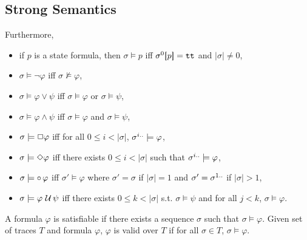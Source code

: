 \documentclass[12pt,a4paper,titlepage]{article}
\theoremstyle{break}
\begin{document}
\subsection{Strong Semantics}
Furthermore,
  \begin{itemize}
\item if $p$ is a state formula, then \(\sigma\models p\) iff \(\sigma^0\lsquarebracket p\rsquarebracket=\true\) and \(|\sigma|\neq 0\),
\item \(\sigma\models\neg\varphi\) iff \(\sigma\not\models\varphi\),
\item \(\sigma\models\varphi\vee\psi\) iff \(\sigma\models\varphi\) or \(\sigma\models\psi\),
\item \(\sigma\models\varphi\wedge\psi\) iff \(\sigma\models\varphi\) and \(\sigma\models\psi\),
\item \(\sigma\models\ltlbox\varphi\) iff for all \(0\leq i<|\sigma|\), \(\suffix{\sigma}{i}\models\varphi\),
\item \(\sigma\models\ltldiammond\varphi\) iff there exists \(0\leq i<|\sigma|\) such that \(\suffix{\sigma}{i}\models\varphi\),
\item \(\sigma\models\ltlnext\varphi\) iff \(\sigma'\models\varphi\) where \(\sigma'=\sigma\) if \(|\sigma|=1\) and \(\sigma'=\suffix{\sigma}{1}\) if \(|\sigma|>1\),
\item \(\sigma\models\varphi\ltluntil\psi\) iff there exists \(0\leq k<|\sigma|\) s.t. \(\sigma\models\psi\) and for all \(j<k\), \(\sigma\models\varphi\).
  \end{itemize}

A formula \(\varphi\) is satisfiable if there exists a sequence \(\sigma\) such that \(\sigma\models \varphi\).
Given set of traces $T$ and formula \(\varphi\), \(\varphi\) is valid over $T$ if for all \(\sigma\in T\), \(\sigma\models\varphi\).
\end{document}
